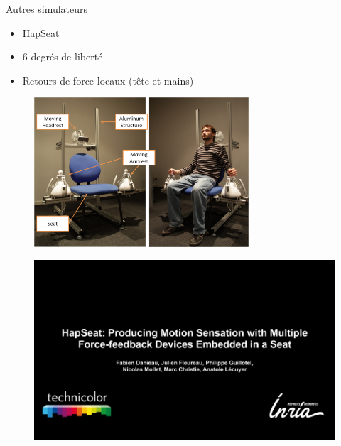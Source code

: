 {
\begin{frame}{Autres simulateurs}
\begin{itemize}
\item HapSeat
\item 6 degrés de liberté
\item Retours de force locaux (tête et mains)
\end{itemize}
\begin{figure}
\centering
\includegraphics[width=8cm]{images/prototype}
\end{figure}
\end{frame}

\begin{frame}
\begin{figure}
\href{run:videos/HapSeat.avi}{\includegraphics[width=\linewidth]{images/hapseat}}
\end{figure}

\end{frame}
}

